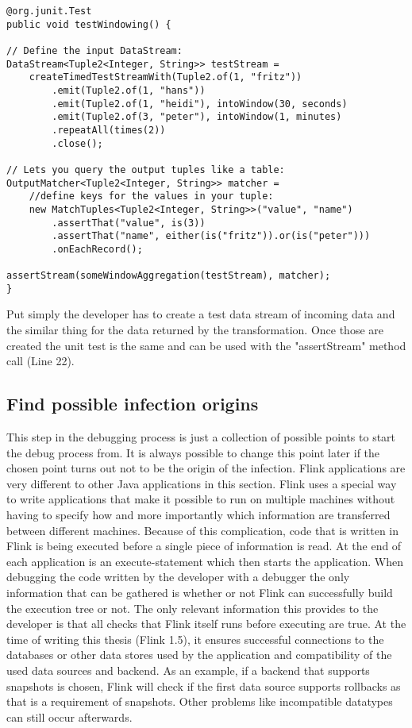 \begin{lstlisting}[caption={FlinkSpector Example: \cite{FlinkSpector}}]
@org.junit.Test
public void testWindowing() {

// Define the input DataStream:
DataStream<Tuple2<Integer, String>> testStream =
    createTimedTestStreamWith(Tuple2.of(1, "fritz"))
        .emit(Tuple2.of(1, "hans"))
        .emit(Tuple2.of(1, "heidi"), intoWindow(30, seconds)
        .emit(Tuple2.of(3, "peter"), intoWindow(1, minutes)
        .repeatAll(times(2))
        .close();

// Lets you query the output tuples like a table:
OutputMatcher<Tuple2<Integer, String>> matcher =
    //define keys for the values in your tuple:
    new MatchTuples<Tuple2<Integer, String>>("value", "name")
        .assertThat("value", is(3))
        .assertThat("name", either(is("fritz")).or(is("peter")))
        .onEachRecord();

assertStream(someWindowAggregation(testStream), matcher);
}
\end{lstlisting}

Put simply the developer has to create a test data stream of incoming data and the similar thing for the data returned by the transformation. Once those are created the unit test is the same and can be used with the "assertStream" method call (Line 22).

\subsection{Find possible infection origins}
This step in the debugging process is just a collection of possible points to start the debug process from. It is always possible to change this point later if the chosen point turns out not to be the origin of the infection. Flink applications are very different to other Java applications in this section. Flink uses a special way to write applications that make it possible to run on multiple machines without having to specify how and more importantly which information are transferred between different machines. Because of this complication, code that is written in Flink is being executed before a single piece of information is read. At the end of each application is an execute-statement which then starts the application. When debugging the code written by the developer with a debugger the only information that can be gathered is whether or not Flink can successfully build the execution tree or not. The only relevant information this provides to the developer is that all checks that Flink itself runs before executing are true. At the time of writing this thesis (Flink 1.5), it ensures successful connections to the databases or other data stores used by the application and compatibility of the used data sources and backend. As an example, if a backend that supports snapshots is chosen, Flink will check if the first data source supports rollbacks as that is a requirement of snapshots. Other problems like incompatible datatypes can still occur afterwards.

